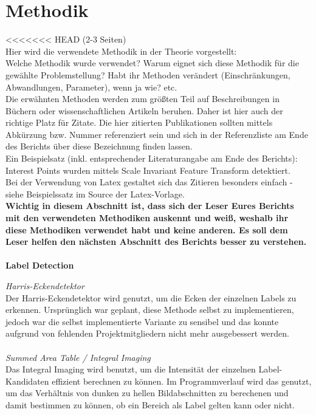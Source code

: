 \documentclass[paper=A4, deutsch]{scrartcl}
\begin{document}

\section{Methodik}
<<<<<<< HEAD
(2-3 Seiten)\\
Hier wird die verwendete Methodik in der Theorie vorgestellt:\\
Welche Methodik wurde verwendet? Warum eignet sich diese Methodik für die gewählte Problemstellung? Habt ihr Methoden verändert (Einschränkungen, Abwandlungen, Parameter), wenn ja wie? etc.\\
Die erwähnten Methoden werden zum größten Teil auf Beschreibungen in Büchern oder wissenschaftlichen Artikeln beruhen. Daher ist hier auch der richtige Platz für Zitate. Die hier zitierten Publikationen sollten mittels Abkürzung bzw. Nummer referenziert sein und sich in der Referenzliste am Ende des Berichts über diese Bezeichnung finden lassen.\\
Ein Beispielsatz (inkl. entsprechender Literaturangabe am Ende des Berichts): Interest Points wurden mittels Scale Invariant Feature Transform \cite{lowe2004} detektiert.\\
Bei der Verwendung von Latex gestaltet sich das Zitieren besonders einfach - siehe Beispielssatz im Source der Latex-Vorlage.\\
\textbf{Wichtig in diesem Abschnitt ist, dass sich der Leser Eures Berichts mit den verwendeten Methodiken auskennt und weiß, weshalb ihr diese Methodiken verwendet habt und keine anderen. Es soll dem Leser helfen den nächsten Abschnitt des Berichts besser zu verstehen.}
\\
\\
\textbf{Label Detection}

\textit{Harris-Eckendetektor} \cite{harris}\\
Der Harris-Eckendetektor wird genutzt, um die Ecken der einzelnen Labels zu erkennen.
Ursprünglich war geplant, diese Methode selbst zu implementieren, jedoch war die selbst implementierte Variante zu sensibel und das konnte aufgrund von fehlenden Projektmitgliedern nicht mehr ausgebessert werden.\\
\\

\textit{Summed Area Table / Integral Imaging} \cite{integralimg}\\
Das Integral Imaging wird benutzt, um die Intensität der einzelnen Label-Kandidaten effizient berechnen zu können. Im Programmverlauf wird das genutzt, um das Verhältnis von dunken zu hellen Bildabschnitten zu berechenen und damit bestimmen zu können, ob ein Bereich als Label gelten kann oder nicht.\\
\\
\end{document}
